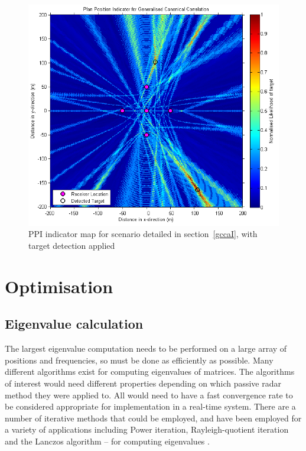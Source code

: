 \documentclass[12pt,openany,a4paper]{book}
\begin{document}
\begin{figure}[htbp]
\centerline{\includegraphics{ppiip.png}}
\caption{PPI indicator map for scenario detailed in section~\ref{gccaI}, with target detection applied}
\label{ppiip}
\end{figure}

\section{Optimisation}


\subsection{Eigenvalue calculation}
The largest eigenvalue computation needs to be performed on a large array of positions and frequencies, so must be done as efficiently as possible. Many different algorithms exist for computing eigenvalues of matrices. The algorithms of interest would need different properties depending on which passive radar method they were applied to. All would need to have a fast convergence rate to be considered appropriate for implementation in a real-time system. There are a number of iterative methods that could be employed, and have been employed for a variety of applications including Power iteration, Rayleigh-quotient iteration and the Lanczos algorithm – for computing eigenvalues \cite{CV17,RA18,IE19}.

\bigskip
\end{document}
